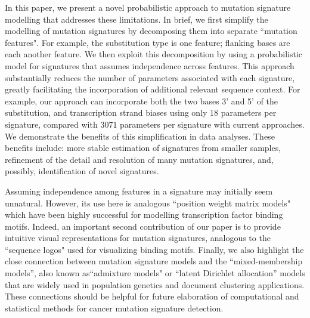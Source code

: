 \documentclass[10pt,letterpaper]{article}
\begin{document}
In this paper, we present a novel probabilistic approach 
to mutation signature modelling that addresses these limitations.
In brief, we first simplify the modelling of mutation signatures by decomposing them into separate ``mutation features".
For example, the substitution type is one feature; flanking bases are each another feature. We then exploit this 
decomposition by using a probabilistic model for signatures that assumes independence across features. This approach substantially reduces the number of parameters associated with
each signature, greatly facilitating the incorporation of additional relevant sequence context. 
For example, our approach can
incorporate both the two bases
3' and 5' of the substitution, and transcription strand biases using only 18 parameters
per signature, compared with 3071 parameters per signature with current approaches. We demonstrate the benefits of this simplification in data analyses. These benefits include: more stable estimation of signatures from smaller samples, 
refinement of the detail and resolution of many mutation signatures, and, possibly, identification of novel signatures.

Assuming independence among features in a signature may initially seem unnatural. However, its use here is analogous  ``position weight matrix models" which have been highly
successful 
for modelling transcription factor binding motifs.
Indeed, an important second contribution of
our paper is to provide intuitive visual representations for mutation signatures,
analogous to the ``sequence logos" used for visualizing binding motifs.
Finally, we also highlight the close connection
between mutation signature models and the ``mixed-membership models'',
also known as``admixture models" \cite{pmid10835412} or ``latent Dirichlet allocation''
models \cite{Blei:2003} that are widely used in population genetics 
and document clustering applications.
These connections should be helpful for future elaboration of 
computational and statistical methods for cancer mutation signature detection. 



\end{document}

